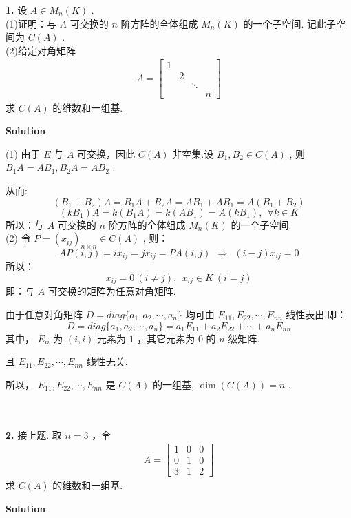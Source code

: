 \documentclass[11pt,a4paper,openany,oneside]{book}
\newcommand\Solution{\noindent\textbf{\textsf{Solution}}\par\medskip}
\begin{document}
\begin{myexample}
	\textbf{1.} 
设 $ A \in M_n(K) $ .  \\
(1)证明：与 $ A $ 可交换的 $ n $ 阶方阵的全体组成 $ M_n(K) $ 的一个子空间. 记此子空间为 $ C(A) $ . \\
(2)给定对角矩阵 
\begin{gather*}
A=
\begin{bmatrix} 
1 &    &   &   \\ 
& 2  &   &   \\
&    & \ddots & \\
&    &    &  n  
\end{bmatrix} 
\end{gather*}
求 $ C(A) $ 的维数和一组基.   \\ 

\end{myexample}
\Solution

(1) 由于 $ E $ 与 $ A $ 可交换，因此 $ C(A) $ 非空集.设 $ B_1, B_2 \in C(A) $ , 则 $ B_1A = AB_1, B_2A = AB_2 $ .

\hspace{4.1em} 从而:
 $$  (B_1+B_2)A = B_1A + B_2A = AB_1 + AB_1 = A(B_1 + B_2)  $$ 
 $$  (kB_1)A = k(B_1A) = k(AB_1) = A(kB_1), \ \ \forall k \in K  $$ 
所以：与 $ A $ 可交换的 $ n $ 阶方阵的全体组成 $ M_n(K) $ 的一个子空间. \\

(2) 令 $  P = (x_{ij})_{n \times n} \in C(A) $ , 则：
 $$  AP(i,j) = ix_{ij} = jx_{ij} = PA(i,j) \ \ \Rightarrow \ \ (i-j)x_{ij} = 0  $$ 
所以：
 $$  x_{ij} = 0 \ (i \neq j), \ \ x_{ij} \in K \ (i = j)  $$ 
即：与 $ A $ 可交换的矩阵为任意对角矩阵.

由于任意对角矩阵 $ D = diag\{a_1, a_2, \cdots, a_n\} $ 均可由 $ E_{11},E_{22}, \cdots, E_{nn} $ 线性表出,即：
 $$  D = diag\{a_1, a_2, \cdots, a_n\} = a_1E_{11} + a_2E_{22} + \cdots + a_nE_{nn}  $$ 
其中， $ E_{ii} $ 为 $ (i,i) $ 元素为 $ 1 $ ，其它元素为 $ 0 $ 的 $ n $ 级矩阵.

且 $ E_{11}, E_{22}, \cdots,E_{nn} $ 线性无关.

所以， $ E_{11}, E_{22}, \cdots,E_{nn} $ 是 $ C(A) $ 的一组基,  $ \dim (C(A)) = n $ . \\  \\  \\


\begin{myexample}
	\textbf{2.} 
接上题. 取 $ n=3 $ ，令
\begin{gather*}
A=
\begin{bmatrix}
1 & 0 & 0 \\
0 & 1 & 0 \\
3 & 1 & 2 
\end{bmatrix}
\end{gather*}
求 $ C(A) $ 的维数和一组基.  \\  

\end{myexample}
\Solution
\end{document}
